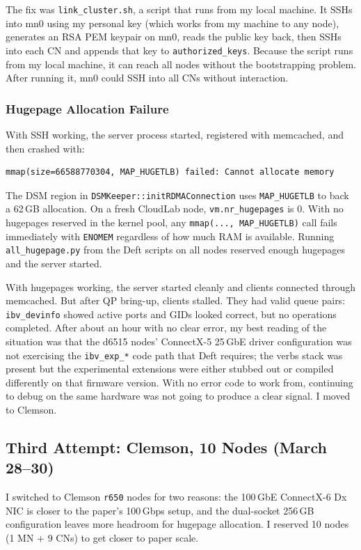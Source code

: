 \documentclass[10pt]{article}
\begin{document}
The fix was \texttt{link\_cluster.sh}, a script that runs from my local machine.
It SSHs into mn0 using my personal key (which works from my machine to any node),
generates an RSA PEM keypair on mn0, reads the public key back, then SSHs into
each CN and appends that key to \texttt{authorized\_keys}.
Because the script runs from my local machine, it can reach all nodes without the
bootstrapping problem.
After running it, mn0 could SSH into all CNs without interaction.

\subsubsection{Hugepage Allocation Failure}

With SSH working, the server process started, registered with memcached,
and then crashed with:
\begin{lstlisting}
mmap(size=66588770304, MAP_HUGETLB) failed: Cannot allocate memory
\end{lstlisting}
The DSM region in \texttt{DSMKeeper::initRDMAConnection} uses \texttt{MAP\_HUGETLB}
to back a 62\,GB allocation.
On a fresh CloudLab node, \texttt{vm.nr\_hugepages} is 0.
With no hugepages reserved in the kernel pool, any \texttt{mmap(..., MAP\_HUGETLB)}
call fails immediately with \texttt{ENOMEM} regardless of how much RAM is available.
Running \texttt{all\_hugepage.py} from the Deft scripts on all nodes reserved
enough hugepages and the server started.

With hugepages working, the server started cleanly and clients connected through
memcached.
But after QP bring-up, clients stalled.
They had valid queue pairs: \texttt{ibv\_devinfo} showed active ports and GIDs
looked correct, but no operations completed.
After about an hour with no clear error, my best reading of the situation was
that the d6515 nodes' ConnectX-5 25\,GbE driver configuration was not exercising
the \texttt{ibv\_exp\_*} code path that Deft requires; the verbs stack was present
but the experimental extensions were either stubbed out or compiled differently
on that firmware version.
With no error code to work from, continuing to debug on the same hardware was
not going to produce a clear signal.
I moved to Clemson.

\subsection{Third Attempt: Clemson, 10 Nodes (March 28--30)}

I switched to Clemson \texttt{r650} nodes for two reasons: the 100\,GbE ConnectX-6 Dx
NIC is closer to the paper's 100\,Gbps setup, and the dual-socket 256\,GB
configuration leaves more headroom for hugepage allocation.
I reserved 10 nodes (1 MN + 9 CNs) to get closer to paper scale.
\end{document}
